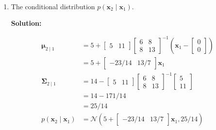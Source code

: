 \documentclass[letter,11pt]{article}
\newenvironment{solution}{
    \vspace{0.16in} {\bf Solution:}
    
}{
	\vspace{0.16in}
}
\newcommand{\xx}{\bm{x}}
\newcommand{\mub}{\bm{\mu}}
\newcommand{\Sigmab}{\bm{\Sigma}}
\newcommand{\m}[1]{\begin{bmatrix}#1\end{bmatrix}}
\newcommand{\N}{\mathcal{N}}
\begin{document}
\begin{enumerate}
\begin{enumerate}[label=(\alph*)]
        \begin{solution}
            \begin{align*}
                p(\xx_1 \mid \xx_2) &= \N(\xx_1 \mid \mub_{1 \mid 2},
                                       \Sigmab_{1 \mid 2}) \\
                \mub_{1 \mid 2} &= \m{0 \\ 0} + \m{5 \\ 11} (1/14) (\xx_2 - 5) \\
                                &= \m{5 \\ 11} (1/14) (\xx_2 - 5) \\
                \Sigmab_{1 \mid 2} &= \m{6 & 8 \\ 8 & 13} - \m{5 \\ 11} (1/14)
                                      \m{5 & 11} \\
                                   &= \m{59/14 & 57/14 \\ 57/14 & 61/14} \\
                p(\xx_1 \mid \xx_2) &= \N\left(\m{5 \\ 11} (1/14) (\xx_2 - 5),
                                       \m{59/14 & 57/14 \\ 57/14 & 61/14}\right)
            \end{align*}
        \end{solution}

        
        \item The conditional distribution $p(\xx_2 \mid \xx_1)$.
        
        \begin{solution}
            \begin{align*}
                \mub_{2 \mid 1} &= 5 + \m{5 & 11} \m{6 & 8 \\ 8 & 13}^{-1}
                                   (\xx_1 - \m{0 \\ 0}) \\
                                &= 5 + \m{-23/14 & 13/7} \xx_1 \\
                \Sigmab_{2 \mid 1} &= 14 - \m{5 & 11} \m{6 & 8 \\ 8 & 13}^{-1}
                                      \m{5 \\ 11} \\
                                   &= 14 - 171/14 \\
                                   &= 25/14 \\
                p(\xx_2 \mid \xx_1) &= \N(5 + \m{-23/14 & 13/7} \xx_1, 25/14)
            \end{align*}
        \end{solution}
    \end{enumerate}


\end{enumerate}
\end{document}
